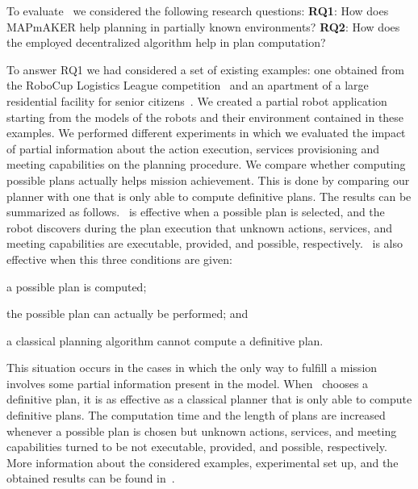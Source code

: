
To evaluate  \toolName\ we considered the following research questions: \textbf{RQ1}: How does MAPmAKER help planning in partially known environments? \textbf{RQ2}: How does the employed decentralized algorithm help in plan computation?

To answer RQ1 we  had considered a set of existing examples:
one obtained from the RoboCup Logistics League competition~\cite{karrasrobocup} and an apartment of a large residential facility for senior citizens~\cite{map}.
We created a partial robot application starting from the models of the robots and their environment contained in these examples.
We performed different experiments in which we evaluated the impact of partial information about the action execution, services provisioning and meeting capabilities on the planning procedure.
We compare whether computing possible plans actually helps mission achievement.
This is done by comparing our planner with one that is only able to compute definitive plans.
The results can be summarized as follows.
\toolName\ is effective when  a possible plan is selected, and the robot discovers during the plan execution 
that unknown actions, services, and meeting capabilities are executable, provided, and possible, respectively.
\toolName\ is also effective when this three conditions are given:
\begin{enumerate*}
\item a possible plan is computed;
\item the possible plan can actually be performed; and 
\item a classical planning algorithm cannot compute a definitive plan.
\end{enumerate*}
This situation occurs in the cases in which the only way to fulfill a mission involves some partial information present in the model.
When \toolName\ chooses a definitive plan, it is as effective as a classical planner that is only able to compute definitive plans.
The computation time and the length of plans are increased whenever  a possible plan is chosen but unknown actions, services, and meeting capabilities turned to be not executable, provided, and possible, respectively.
More information about the considered examples, experimental set up, and the obtained results can be found in~\cite{menghi2018multi}.


